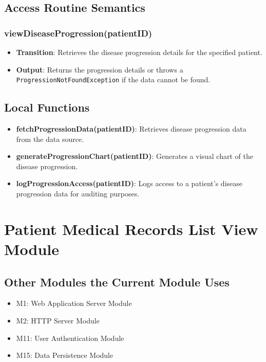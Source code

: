 \documentclass[12pt, titlepage]{article}
\begin{document}
\subsection{Access Routine Semantics}
\subsubsection{viewDiseaseProgression(patientID)}
\begin{itemize}
    \item \textbf{Transition}: Retrieves the disease progression details for the specified patient.
    \item \textbf{Output}: Returns the progression details or throws a \texttt{ProgressionNotFoundException} if the data cannot be found.
\end{itemize}

\subsection{Local Functions}
\begin{itemize}
\item \textbf{fetchProgressionData(patientID)}: Retrieves disease progression data from the data source.
\item \textbf{generateProgressionChart(patientID)}: Generates a visual chart of the disease progression.
\item \textbf{logProgressionAccess(patientID)}: Logs access to a patient's disease progression data for auditing purposes.
\end{itemize}
\section{Patient Medical Records List View Module}

\subsection{Other Modules the Current Module Uses}
\begin{itemize}
    \item M1: Web Application Server Module
    \item M2: HTTP Server Module
    \item M11: User Authentication Module
    \item M15: Data Persistence Module
\end{itemize}
\end{document}
